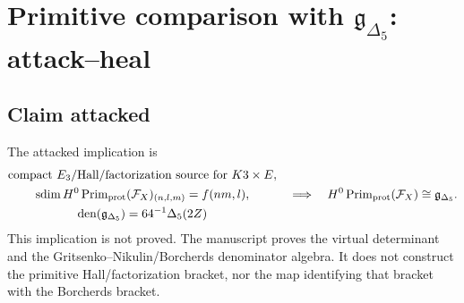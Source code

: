 \section{Primitive comparison with \texorpdfstring{\(\mathfrak g_{\Delta_5}\)}{gDelta5}: attack--heal}
\label{sec:primitive-comparison-attack-heal}

\providecommand{\Z}{\mathbb Z}
\providecommand{\C}{\mathbb C}
\providecommand{\La}{\Lambda}
\providecommand{\Prim}{\operatorname{Prim}}
\providecommand{\sdim}{\operatorname{sdim}}
\providecommand{\smult}{\operatorname{smult}}
\providecommand{\autcor}{\mathfrak g_{\Delta_5}}
\providecommand{\Hall}{\mathcal H}
\providecommand{\BM}{\operatorname{BM}}
\providecommand{\Fact}{\mathsf{Fact}}
\providecommand{\Den}{\mathsf{Den}}

\subsection{Claim attacked}

The attacked implication is
\[
\begin{gathered}
\hbox{compact }E_3/\hbox{Hall/factorization source for }K3\times E,\\
\sdim H^0\Prim_{\mathrm{prot}}(\mathcal F_X)_{(n,l,m)}=f(nm,l),\\
\operatorname{den}(\autcor)=64^{-1}\Delta_5(2Z)
\end{gathered}
\quad\Longrightarrow\quad
H^0\Prim_{\mathrm{prot}}(\mathcal F_X)\cong\autcor .
\]
This implication is not proved.  The manuscript proves the virtual
determinant and the Gritsenko--Nikulin/Borcherds denominator algebra.  It
does not construct the primitive Hall/factorization bracket, nor the map
identifying that bracket with the Borcherds bracket.

